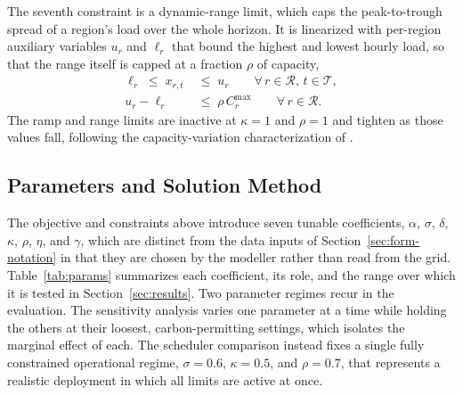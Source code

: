 The seventh constraint is a dynamic-range limit, which caps the peak-to-trough spread of a region's load over the whole horizon. It is linearized with per-region auxiliary variables $u_r$ and $\ell_r$ that bound the highest and lowest hourly load, so that the range itself is capped at a fraction $\rho$ of capacity,
\begin{align}
\ell_r \;\leq\; x_{r,t} &\;\leq\; u_r \qquad \forall\, r \in \mathcal{R},\, t \in \mathcal{T}, \tag{C7a}\label{eq:c7a}\\
u_r - \ell_r &\;\leq\; \rho\, C^{\max}_{r} \qquad \forall\, r \in \mathcal{R}. \tag{C7b}\label{eq:c7b}
\end{align}
The ramp and range limits are inactive at $\kappa = 1$ and $\rho = 1$ and tighten as those values fall, following the capacity-variation characterization of \citet{wijayawardana2025scheduling}.

\subsection{Parameters and Solution Method}
\label{sec:form-parameters}

The objective and constraints above introduce seven tunable coefficients, $\alpha$, $\sigma$, $\delta$, $\kappa$, $\rho$, $\eta$, and $\gamma$, which are distinct from the data inputs of Section~\ref{sec:form-notation} in that they are chosen by the modeller rather than read from the grid. Table~\ref{tab:params} summarizes each coefficient, its role, and the range over which it is tested in Section~\ref{sec:results}. Two parameter regimes recur in the evaluation. The sensitivity analysis varies one parameter at a time while holding the others at their loosest, carbon-permitting settings, which isolates the marginal effect of each. The scheduler comparison instead fixes a single fully constrained operational regime, $\sigma = 0.6$, $\kappa = 0.5$, and $\rho = 0.7$, that represents a realistic deployment in which all limits are active at once.

